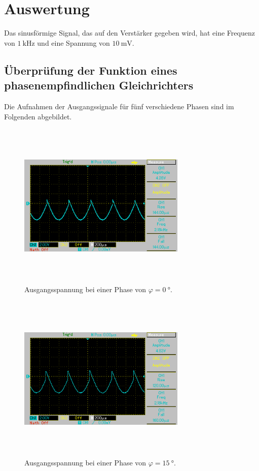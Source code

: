 \section{Auswertung}
\label{sec:Auswertung}

Das sinusförmige Signal, das auf den Verstärker gegeben wird, hat eine Frequenz
von $\SI{1}{\kilo\hertz}$ und eine Spannung von $\SI{10}{\milli\volt}$. %

\subsection{Überprüfung der Funktion eines phasenempfindlichen Gleichrichters}
Die Aufnahmen der Ausgangssignale für fünf verschiedene Phasen sind im Folgenden abgebildet.
\begin{figure}
    \centering
    \includegraphics[width=8cm, height=8cm]{build/1.BMP}
    \caption{Ausgangsspannung bei einer Phase von $\varphi = \SI{0}{\degree}$.}
    \label{fig:bild1}
\end{figure}

\begin{figure}
    \centering
    \includegraphics[width=8cm, height=8cm]{build/2.BMP}
    \caption{Ausgangsspannung bei einer Phase von $\varphi = \SI{15}{\degree}$.}
    \label{fig:bild2}
\end{figure}

